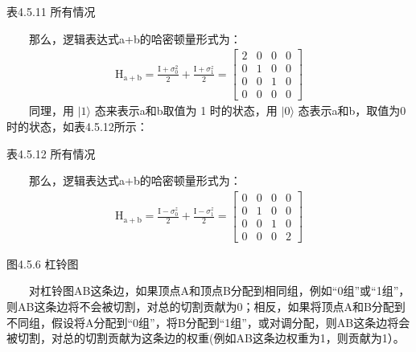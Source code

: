 \documentclass[a4paper,11pt,english]{sphinxmanual}
\let\sphinxpxdimen\pdfpxdimen\else\newdimen\sphinxpxdimen
\begin{document}
\begin{center}表4.5.11 所有情况
\end{center}

\sphinxAtStartPar
  那么，逻辑表达式a+b的哈密顿量形式为：
\begin{equation*}
\begin{split}\mathrm{H}_{\mathrm{a}+\mathrm{b}}=\frac{\mathrm{I}+\sigma_{0}^{2}}{2}+\frac{\mathrm{I}+\sigma_{1}^{z}}{2}=\left[\begin{array}{llll} 2 & 0 & 0 & 0 \\ 0 & 1 & 0 & 0 \\ 0 & 0 & 1 & 0 \\ 0 & 0 & 0 & 0 \end{array}\right]\end{split}
\end{equation*}
\sphinxAtStartPar
  同理，用  \(|1\rangle\) 态来表示a和b取值为 1 时的状态，用  \(|0\rangle\) 态表示a和b，取值为0时的状态，如表4.5.12所示：

\begin{center}表4.5.12 所有情况
\end{center}

\sphinxAtStartPar
  那么，逻辑表达式a+b的哈密顿量形式为：
\begin{equation*}
\begin{split}\mathrm{H}_{\mathrm{a}+\mathrm{b}}=\frac{\mathrm{I}-\sigma_{0}^{z}}{2}+\frac{\mathrm{I}-\sigma_{1}^{z}}{2}=\left[\begin{array}{llll} 0 & 0 & 0 & 0 \\ 0 & 1 & 0 & 0 \\ 0 & 0 & 1 & 0 \\ 0 & 0 & 0 & 2 \end{array}\right]\end{split}
\end{equation*}
\sphinxAtStartPar
{}

\noindent{\hspace*{\fill}\sphinxincludegraphics[width=360\sphinxpxdimen]{{4.5.6}.png}\hspace*{\fill}}

\begin{center}图4.5.6 杠铃图
\end{center}
\sphinxAtStartPar
  对杠铃图AB这条边，如果顶点A和顶点B分配到相同组，例如“0组”或“1组”，则AB这条边将不会被切割，对总的切割贡献为0；相反，如果将顶点A和B分配到不同组，假设将A分配到“0组”，将B分配到“1组”，或对调分配，则AB这条边将会被切割，对总的切割贡献为这条边的权重(例如AB这条边权重为1，则贡献为1）。
\end{document}
